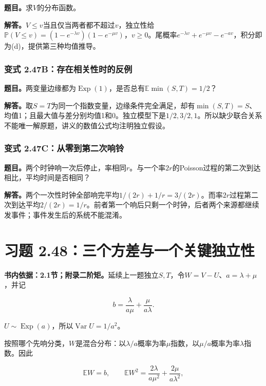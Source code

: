 \documentclass[12pt,a4paper,UTF8,fontset=fandol]{ctexart}
\begin{document}
\textbf{题目。}求\(V\)的分布函数。

\textbf{解答。}\(V\le v\)当且仅当两者都不超过\(v\)，独立性给\(\mathbb P(V\le v)=(1-e^{-\lambda v})(1-e^{-\mu v})\)，\(v\ge0\)。尾概率\(e^{-\lambda v}+e^{-\mu v}-e^{-av}\)，积分即为(d)，提供第三种均值推导。

\subsubsection{变式
2.47B：存在相关性时的反例}\label{ux53d8ux5f0f-2.47bux5b58ux5728ux76f8ux5173ux6027ux65f6ux7684ux53cdux4f8b}

\textbf{题目。}两变量边缘都为\(\operatorname{Exp}(1)\)，是否总有\(\mathbb E\min(S,T)=1/2\)？

\textbf{解答。}取\(S=T\)为同一个指数变量，边缘条件完全满足，却有\(\min(S,T)=S\)、均值1；且最大值与差分别均值1和0。独立模型下是\(1/2,3/2,1\)。所以缺少联合关系不能唯一解原题，讲义的数值公式均注明独立假设。

\subsubsection{变式
2.47C：从零到第二次响铃}\label{ux53d8ux5f0f-2.47cux4eceux96f6ux5230ux7b2cux4e8cux6b21ux54cdux94c3}

\textbf{题目。}两个时钟响一次后停止，率相同\(r\)。与一个率\(2r\)的Poisson过程的第二次到达相比，平均时间是否相同？

\textbf{解答。}两个一次性时钟全部响完平均\(1/(2r)+1/r=3/(2r)\)。而率\(2r\)过程第二次到达平均\(2/(2r)=1/r\)。前者第一个响后只剩一个时钟，后者两个来源都继续发事件；事件发生后的系统不能混淆。

\section{习题
2.48：三个方差与一个关键独立性}\label{ux4e60ux9898-2.48ux4e09ux4e2aux65b9ux5deeux4e0eux4e00ux4e2aux5173ux952eux72ecux7acbux6027}

\textbf{书内依据：2.1节；附录二阶矩。}延续上一题独立\(S,T\)，令\(W=V-U\)、\(a=\lambda+\mu\)，并记

\[b=\frac\lambda{a\mu}+\frac\mu{a\lambda}.\]

\(U\sim\operatorname{Exp}(a)\)，所以\(\boxed{\operatorname{Var}U=1/a^2}\)。

按照哪个先响分类，\(W\)是混合分布：以\(\lambda/a\)概率为率\(\mu\)指数，以\(\mu/a\)概率为率\(\lambda\)指数。因此

\[
\mathbb EW=b,\qquad
\mathbb EW^2=\frac{2\lambda}{a\mu^2}+\frac{2\mu}{a\lambda^2},
\]
\end{document}
